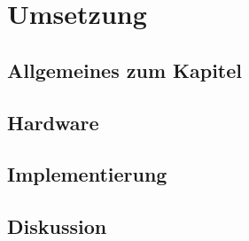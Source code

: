 \chapter{Umsetzung}
\label{chap:umsetzung}

  \section{Allgemeines zum Kapitel}
  \label{sec:allgemeines}  
  \section{Hardware}
	\section{Implementierung}

  \section{Diskussion}
  \label{sec:diskussion}
     
         
      